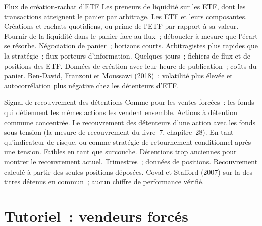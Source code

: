 \begin{strategyfile}{Flux de création-rachat d'ETF}\label{strat:s1:flows:etf}
 Les preneurs de liquidité sur les ETF, dont les transactions atteignent le panier par arbitrage.
 Les ETF et leurs composantes.
 Créations et rachats quotidiens, ou prime de l'ETF par rapport à sa valeur.
 Fournir de la liquidité dans le panier face au flux~; déboucler à mesure que l'écart se résorbe.
 Négociation de panier~; horizons courts.
 Arbitragistes plus rapides que la stratégie~; flux porteurs d'information.
 Quelques jours~; fichiers de flux et de positions des ETF.
 Données de création avec leur heure de publication~; coûts du panier.
 Ben-David, Franzoni et Moussawi (2018)~: volatilité plus élevée et autocorrélation plus négative chez les détenteurs d'ETF.
\end{strategyfile}

\begin{strategyfile}{Signal de recouvrement des détentions}\label{strat:s1:flows:overlap}
 Comme pour les ventes forcées~: les fonds qui détiennent les mêmes actions les vendent ensemble.
 Actions à détention commune concentrée.
 Le recouvrement des détenteurs d'une action avec les fonds sous tension (la mesure de recouvrement du livre~7, chapitre~28).
 En tant qu'indicateur de risque, ou comme stratégie de retournement conditionnel après une tension.
 Faibles en tant que surcouche.
 Détentions trop anciennes pour montrer le recouvrement actuel.
 Trimestres~; données de positions.
 Recouvrement calculé à partir des seules positions déposées.
 Coval et Stafford (2007) sur la  des titres détenus en commun~; aucun chiffre de performance vérifié.
\end{strategyfile}

\section{Tutoriel~: vendeurs forcés}\label{tut:s1:flows:tut}

